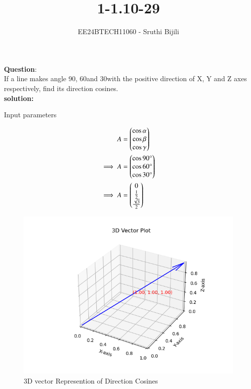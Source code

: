 \documentclass[journal]{IEEEtran}
\begin{document}

\vspace{3cm}

\title{1-1.10-29}
\author{EE24BTECH11060 - Sruthi Bijili}
{\let\newpage\relax\maketitle}

\renewcommand{\thefigure}{\theenumi}
\renewcommand{\thetable}{\theenumi}
\setlength{\intextsep}{10pt} %


\renewcommand{\thetable}{\theenumi}

\textbf{Question}:\\
If a line makes angle 90\degree , 60\degree and 30\degree  with the positive direction of X, Y and Z axes respectively, find its direction cosines.\\
\textbf{solution:}
\begin{table}[h!]    
  \centering
  
  \caption{Input parameters}
\end{table}
\begin{align}
  A&=\begin{pmatrix}\cos{\alpha}\\ \cos{\beta} \\ \cos{\gamma}\end{pmatrix}\\
  \implies A&=\begin{pmatrix}\cos{90\degree}\\ \cos{60\degree} \\ \cos{30\degree}\end{pmatrix}\\
  \implies A&=\begin{pmatrix}0\\ \frac{1}{2}\\ \frac{\sqrt{3}}{2}\end{pmatrix}
\end{align}
\begin{figure}[h!]
   \centering
   \includegraphics[width=0.7\linewidth]{figs/fig1.png}
   \caption{3D vector Represention of Direction Cosines}
\end{figure}
\end{document}
